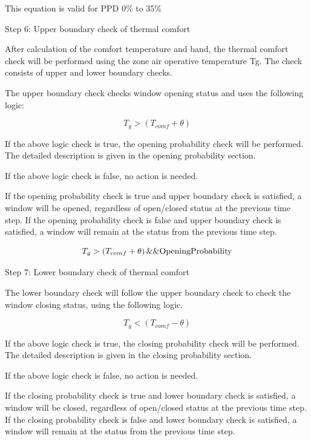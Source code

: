 This equation is valid for PPD 0\% to 35\%

Step 6: Upper boundary check of thermal comfort

After calculation of the comfort temperature and band, the thermal comfort check will be performed using the zone air operative temperature Tg. The check consists of upper and lower boundary checks.

The upper boundary check checks window opening status and uses the following logic:

\begin{equation}
T_g > \left(T_{comf} + \theta\right)
\end{equation}

If the above logic check is true, the opening probability check will be performed. The detailed description is given in the opening probability section.

If the above logic check is false, no action is needed.

If the opening probability check is true and upper boundary check is satisfied, a window will be opened, regardless of open/closed status at the previous time step. If the opening probability check is false and upper boundary check is satisfied, a window will remain at the status from the previous time step.

\begin{equation}
T_g > \left(T_{comf} + \theta\right) \&\& \rm{OpeningProbability}
\end{equation}

Step 7: Lower boundary check of thermal comfort

The lower boundary check will follow the upper boundary check to check the window closing status, using the following logic.

\begin{equation}
T_g < \left(T_{comf} - \theta\right)
\end{equation}

If the above logic check is true, the closing probability check will be performed. The detailed description is given in the closing probability section.

If the above logic check is false, no action is needed.

If the closing probability check is true and lower boundary check is satisfied, a window will be closed, regardless of open/closed status at the previous time step. If the closing probability check is false and lower boundary check is satisfied, a window will remain at the status from the previous time step.

